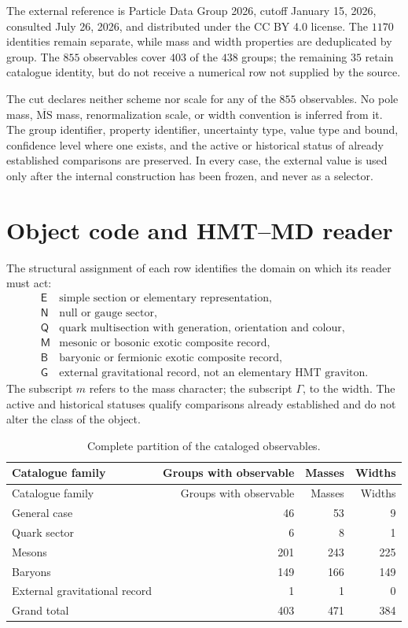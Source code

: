 The external reference is Particle Data Group 2026, cutoff January 15,
2026, consulted July 26, 2026, and distributed under the CC BY 4.0 license.
The \(1170\) identities remain separate, while mass and width properties
are deduplicated by group. The \(855\) observables cover \(403\) of the
\(438\) groups; the remaining \(35\) retain catalogue identity, but do not
receive a numerical row not supplied by the source.

The cut declares neither scheme nor scale for any of the \(855\) observables.
No pole mass, \(\overline{\mathrm{MS}}\) mass, renormalization scale, or width
convention is inferred from it. The group identifier, property identifier,
uncertainty type, value type and bound, confidence level where one exists,
and the active or historical status of already established comparisons are
preserved. In every case, the external value is used only after
the internal construction has been frozen, and never as a selector.

\section{Object code and HMT--MD reader}

The structural assignment of each row identifies the domain on which its reader must
act:
\[
\begin{array}{c|l}
\mathsf E&\text{simple section or elementary representation},\\
\mathsf N&\text{null or gauge sector},\\
\mathsf Q&\text{quark multisection with generation, orientation and colour},\\
\mathsf M&\text{mesonic or bosonic exotic composite record},\\
\mathsf B&\text{baryonic or fermionic exotic composite record},\\
\mathsf G&\text{external gravitational record, not an elementary HMT graviton}.
\end{array}
\tag{I2}\label{eq:cobertura-inventario-total-rev6}
\]
The subscript \(m\) refers to the mass character; the subscript \(\Gamma\), to the
width. The active and historical statuses qualify comparisons already
established and do not alter the class of the object.

\begin{longtable}{@{}lrrr@{}}
\caption{Complete partition of the cataloged observables.}
\label{tab:particion-inventario-total-rev6}\\
\toprule
Catalogue family & Groups with observable & Masses & Widths\\
\midrule
\endfirsthead
\toprule
Catalogue family & Groups with observable & Masses & Widths\\
\midrule
\endhead
General case &46&53&9\\
Quark sector&6&8&1\\
Mesons&201&243&225\\
Baryons&149&166&149\\
External gravitational record&1&1&0\\
\midrule
Grand total&403&471&384\\
\bottomrule
\end{longtable}

